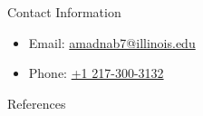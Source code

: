 \documentclass[final]{beamer}
\newlength{\onecolwid}
\newlength{\threecolwid}
\begin{document}
\begin{frame}[t]
\begin{columns}[t,totalwidth=\threecolwid]
\begin{column}{\onecolwid}
\begin{alertblock}{Contact Information}
	\begin{itemize}
		\item Email: \href{mailto:amandab7@illinois.edu}{amadnab7@illinois.edu}
		\item Phone: \href{tel:12173003132}{+1 217-300-3132}
	\end{itemize}
	
\end{alertblock}

\begin{block}{References}

	{\footnotesize 
	}
\end{block}





\end{column} %

\end{columns} %

\end{frame} %
\end{document}
